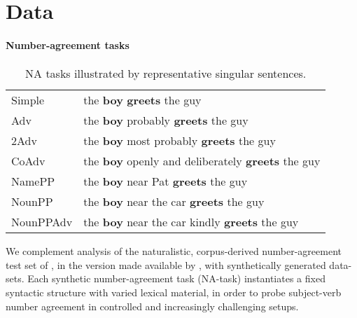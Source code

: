 \section{Data}\label{sec:the_data}

\paragraph{Number-agreement tasks}
\begin{table}[tb]
  \centering
  \begin{footnotesize}
  \begin{tabular}{l@{\hskip1pt}l}
    \B Simple & the \textbf{boy} \textbf{greets} the guy\\
    \B Adv & the \textbf{boy} probably \textbf{greets} the guy\\
    \B 2Adv & the \textbf{boy} most probably \textbf{greets} the guy\\
    \B CoAdv &  the \textbf{boy} openly and deliberately \textbf{greets} the guy\\
    \B NamePP & the \textbf{boy} near Pat \textbf{greets} the guy\\
    \B NounPP & the \textbf{boy} near the car \textbf{greets} the guy\\
    \B NounPPAdv & the \textbf{boy} near the car kindly \textbf{greets} the guy\\
  \end{tabular}
  \end{footnotesize}
  \caption{NA tasks illustrated by representative
    singular sentences.}
  \label{tab:data-sets}
\end{table}

We complement analysis of the naturalistic, corpus-derived
number-agreement test set of , in the
version made available by , with
synthetically generated data-sets. Each synthetic number-agreement task
(NA-task) instantiates a fixed syntactic structure with varied lexical
material, in order to probe subject-verb number agreement in
controlled and increasingly challenging setups.

